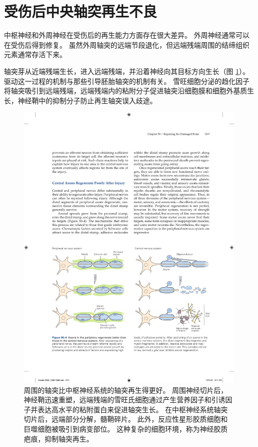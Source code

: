 \section{受伤后中央轴突再生不良}

中枢神经和外周神经在受伤后的再生能力方面存在很大差异。 外周神经通常可以在受伤后得到修复。 虽然外周轴突的远端节段退化，但远端残端周围的结缔组织元素通常存活下来。

轴突芽从近端残端生长，进入远端残端，并沿着神经向其目标方向生长（图 \ref{fig:50_4}）。
驱动这一过程的机制与那些引导胚胎轴突的机制有关。 雪旺细胞分泌的趋化因子将轴突吸引到远端残端，远端残端内的粘附分子促进轴突沿细胞膜和细胞外基质生长，神经鞘中的抑制分子防止再生轴突误入歧途。

\begin{figure}[htbp]
	\centering
	\includegraphics[width=0.95\linewidth]{chap50/fig_50_4}
	\caption{周围的轴突比中枢神经系统的轴突再生得更好。 周围神经切片后，神经鞘迅速重塑，远端残端的雪旺氏细胞通过产生营养因子和引诱因子并表达高水平的粘附蛋白来促进轴突生长。 在中枢神经系统轴突切片后，远端部分分解，髓鞘碎片。 此外，反应性星形胶质细胞和巨噬细胞被吸引到病变部位。 这种复杂的细胞环境，称为神经胶质疤痕，抑制轴突再生。}
	\label{fig:50_4}
\end{figure}

